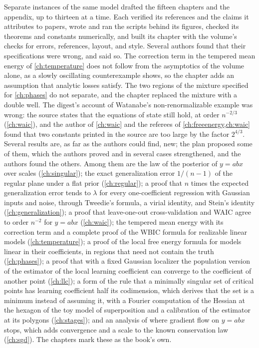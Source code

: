 Separate instances of the same model drafted the fifteen chapters and the appendix, up to thirteen at a time. Each verified its references and the claims it attributes to papers, wrote and ran the scripts behind its figures, checked its theorems and constants numerically, and built its chapter with the volume's checks for errors, references, layout, and style. Several authors found that their specifications were wrong, and said so. The correction term in the tempered mean energy of \cref{ch:temperature} does not follow from the asymptotics of the volume alone, as a slowly oscillating counterexample shows, so the chapter adds an assumption that analytic losses satisfy. The two regions of the mixture specified for \cref{ch:phases} do not separate, and the chapter replaced the mixture with a double well. The digest's account of Watanabe's non-renormalizable example was wrong: the source states that the equations of state still hold, at order $n^{-2/3}$ (\cref{ch:waic}), and the author of \cref{ch:waic} and the referees of \cref{ch:freeenergy,ch:waic} found that two constants printed in the source are too large by the factor $2^{4/3}$. Several results are, as far as the authors could find, new; the plan proposed some of them, which the authors proved and in several cases strengthened, and the authors found the others. Among them are the law of the posterior of $y=abx$ over scales (\cref{ch:singular}); the exact generalization error $1/(n-1)$ of the regular plane under a flat prior (\cref{ch:regular}); a proof that $n$ times the expected generalization error tends to $\lambda$ for every one-coefficient regression with Gaussian inputs and noise, through Tweedie's formula, a virial identity, and Stein's identity (\cref{ch:generalization}); a proof that leave-one-out cross-validation and WAIC agree to order $n^{-2}$ for $y=abx$ (\cref{ch:waic}); the tempered mean energy with its correction term and a complete proof of the WBIC formula for realizable linear models (\cref{ch:temperature}); a proof of the local free energy formula for models linear in their coefficients, in regions that need not contain the truth (\cref{ch:phases}); a proof that with a fixed Gaussian localizer the population version of the estimator of the local learning coefficient can converge to the coefficient of another point (\cref{ch:llc}); a form of the rule that a minimally singular set of critical points has learning coefficient half its codimension, which derives that the set is a minimum instead of assuming it, with a Fourier computation of the Hessian at the hexagon of the toy model of superposition and a calibration of the estimator at its polygons (\cref{ch:stages}); and an analysis of where gradient flow on $y=abx$ stops, which adds convergence and a scale to the known conservation law (\cref{ch:sgd}). The chapters mark these as the book's own.

